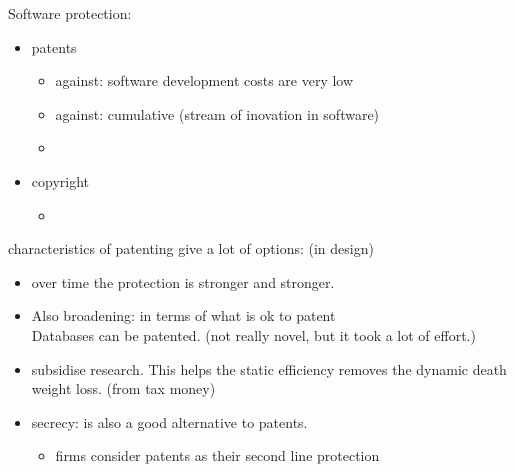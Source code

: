 \documentclass[12pt, a4paper, titlepage]{extarticle}
\begin{document}
Software protection:
\begin{itemize}
    \item patents
    \begin{itemize}
        \item against: software development costs are very low
        \item against: cumulative (stream of inovation in software)
        \item 
    \end{itemize}
    \item copyright
    \begin{itemize}
        \item  
    \end{itemize}
\end{itemize}

characteristics of patenting give a lot of options: (in design)
\begin{itemize}
    \item over time the protection is stronger and stronger. 
    \item Also broadening: in terms of what is ok to patent\\
    Databases can be patented. (not really novel, but it took a lot of effort.)
    \item subsidise research. This helps the static efficiency removes the dynamic death weight loss. (from tax money)
    \item secrecy: is also a good alternative to patents.
    \begin{itemize}
        \item firms consider patents as their second line protection
    \end{itemize}
\end{itemize}
\end{document}
